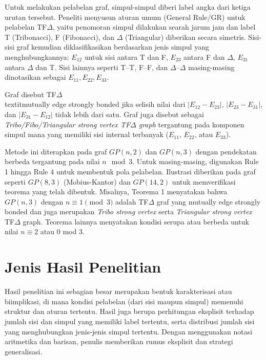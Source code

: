 \documentclass[12pt]{article}
\begin{document}
Untuk melakukan pelabelan graf, simpul-simpul diberi label angka dari ketiga urutan tersebut. Peneliti menyusun aturan umum (General Rule/GR) untuk pelabelan TF$\Delta$, yaitu penomoran simpul dilakukan searah jarum jam dan label T (Tribonacci), F (Fibonacci), dan $\Delta$ (Triangular) diberikan secara simetris. Sisi-sisi graf kemudian diklasifikasikan berdasarkan jenis simpul yang menghubungkannya: $E_{12}$ untuk sisi antara T dan F, $E_{23}$ antara F dan $\Delta$, $E_{31}$ antara $\Delta$ dan T. Sisi lainnya seperti T--T, F--F, dan $\Delta$--$\Delta$ masing-masing dinotasikan sebagai $E_{11}, E_{22}, E_{33}$.

Graf disebut TF$\Delta$ \\textit{mutually edge strongly bonded} jika selisih nilai dari $|E_{12} - E_{23}|$, $|E_{23} - E_{31}|$, dan $|E_{31} - E_{12}|$ tidak lebih dari satu. Graf juga disebut sebagai \textit{Tribo/Fibo/Triangular strong vertex TF$\Delta$ graph} tergantung pada komponen simpul mana yang memiliki sisi internal terbanyak ($E_{11}$, $E_{22}$, atau $E_{33}$).

Metode ini diterapkan pada graf $GP(n,2)$ dan $GP(n,3)$ dengan pendekatan berbeda tergantung pada nilai $n \mod 3$. Untuk masing-masing, digunakan Rule 1 hingga Rule 4 untuk membentuk pola pelabelan. Ilustrasi diberikan pada graf seperti $GP(8,3)$ (Mobius-Kantor) dan $GP(14,2)$ untuk memverifikasi teorema yang telah dibentuk. Misalnya, Teorema 1 menyatakan bahwa $GP(n,3)$ dengan $n \equiv 1 \pmod{3}$ adalah TF$\Delta$ graf yang mutually edge strongly bonded dan juga merupakan \textit{Tribo strong vertex} serta \textit{Triangular strong vertex} TF$\Delta$ graph. Teorema lainnya menyatakan kondisi serupa atau berbeda untuk nilai $n \equiv 2$ atau $0$ mod 3.

\section{Jenis Hasil Penelitian}
Hasil penelitian ini sebagian besar merupakan bentuk karakterisasi atau biimplikasi, di mana kondisi pelabelan (dari sisi maupun simpul) memenuhi struktur dan aturan tertentu. Hasil juga berupa perhitungan eksplisit terhadap jumlah sisi dan simpul yang memiliki label tertentu, serta distribusi jumlah sisi yang menghubungkan jenis-jenis simpul tertentu. Dengan menggunakan notasi aritmetika dan barisan, penulis memberikan rumus eksplisit dan strategi generalisasi.
\end{document}
